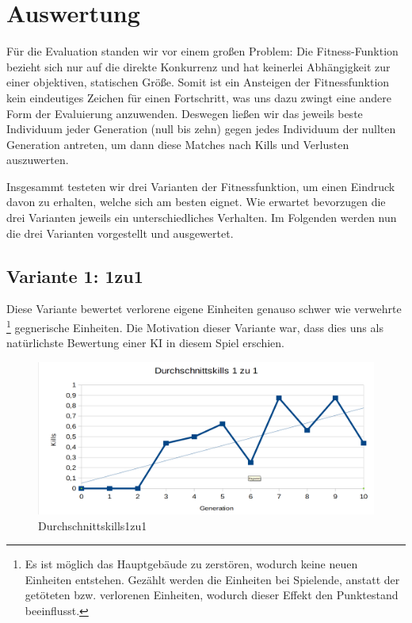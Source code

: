 \documentclass[
	12pt,
	a4paper,
	BCOR10mm,
	DIV14,
	headsepline,
	usegeometry,
]{scrreprt}
\begin{document}
\chapter{Auswertung}
\label{Auswertung}
Für die Evaluation standen wir vor einem großen Problem: Die Fitness-Funktion bezieht sich nur auf die direkte Konkurrenz und hat keinerlei Abhängigkeit zur einer objektiven, statischen Größe.
Somit ist ein Ansteigen der Fitnessfunktion kein eindeutiges Zeichen für einen Fortschritt, was uns dazu zwingt eine andere Form der Evaluierung anzuwenden.
Deswegen ließen wir das jeweils beste Individuum jeder Generation (null bis zehn) gegen jedes Individuum der nullten Generation antreten, um dann diese Matches nach Kills und Verlusten auszuwerten.

Insgesammt testeten wir drei Varianten der Fitnessfunktion, um einen Eindruck davon zu erhalten, welche sich am besten eignet.
Wie erwartet bevorzugen die drei Varianten jeweils ein unterschiedliches Verhalten.
Im Folgenden werden nun die drei Varianten vorgestellt und ausgewertet.

\section{Variante 1: 1zu1}
Diese Variante bewertet verlorene eigene Einheiten genauso schwer wie verwehrte \footnote{Es ist möglich das Hauptgebäude zu zerstören, wodurch keine neuen Einheiten entstehen.
Gezählt werden die Einheiten bei Spielende, anstatt der getöteten bzw. verlorenen Einheiten, wodurch dieser Effekt den Punktestand beeinflusst.} gegnerische Einheiten.
Die Motivation dieser Variante war, dass dies uns als natürlichste Bewertung einer KI in diesem Spiel erschien.

\begin{figure}[h]
	\includegraphics[width = \textwidth]{Durchschnittskills1zu1.png}
	\caption{Durchschnittskills1zu1}
	\label{Durchschnittskills1zu1}
\end{figure}
\end{document}
